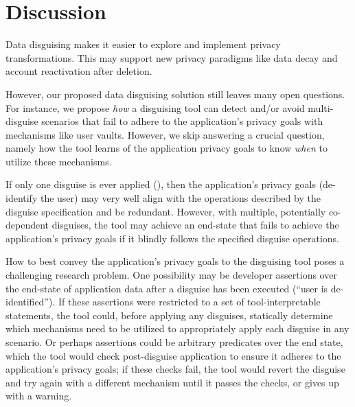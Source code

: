 \section{Discussion}
\label{s:disc}
Data disguising makes it easier to explore and implement privacy transformations. This may support
new privacy paradigms like data decay and account reactivation after deletion.

However, our proposed data disguising solution still leaves many open questions. 
%
For instance, we propose \emph{how} a disguising tool can detect and/or avoid multi-disguise
scenarios that fail to adhere to the application's privacy goals with mechanisms like user vaults.
However, we skip answering a crucial question, namely how the tool learns of the application
privacy goals to know \emph{when} to utilize these mechanisms.

If only one disguise is ever applied (\eg \gdpr), then the application's
privacy goals (\eg de-identify the user) may very well align with the operations described by the
disguise specification and be redundant.  However, with multiple, potentially co-dependent disguises,
the tool may achieve an end-state that fails to achieve the application's privacy goals if it
blindly follows the specified disguise operations.

How to best convey the application's privacy goals to the disguising tool poses a challenging
research problem. One possibility may be developer assertions over the end-state of application data
after a disguise has been executed (\eg ``user is de-identified''). If these assertions were
restricted to a set of tool-interpretable statements, the tool could, before applying any disguises,
statically determine which mechanisms need to be utilized to appropriately apply each disguise in
any scenario.  Or perhaps assertions could be arbitrary predicates over the end state, which the
tool would check post-disguise application to ensure it adheres to the application's privacy goals;
if these checks fail, the tool would revert the disguise and try again with a different mechanism
until it passes the checks, or gives up with a warning.

